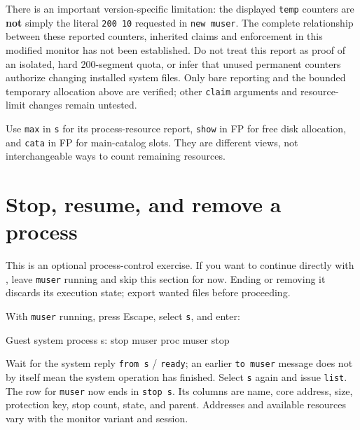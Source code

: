 There is an important version-specific limitation: the displayed \passthrough{\lstinline!temp!} counters are \textbf{not} simply the literal \passthrough{\lstinline!200 10!} requested in \passthrough{\lstinline!new muser!}. The complete relationship between these reported counters, inherited claims and enforcement in this modified monitor has not been established. Do not treat this report as proof of an isolated, hard 200-segment quota, or infer that unused permanent counters authorize changing installed system files. Only bare reporting and the bounded temporary allocation above are verified; other \passthrough{\lstinline!claim!} arguments and resource-limit changes remain untested.

Use \passthrough{\lstinline!max!} in \passthrough{\lstinline!s!} for its process-resource report, \passthrough{\lstinline!show!} in FP for free disk allocation, and \passthrough{\lstinline!cata!} in FP for main-catalog slots. They are different views, not interchangeable ways to count remaining resources.

\section{Stop, resume, and remove a process}\label{stop-resume-and-remove-a-process}

This is an optional process-control exercise. If you want to continue directly
with ,
leave \texttt{muser} running and skip this section for now. Ending or removing
it discards its execution state; export wanted files before proceeding.

With \passthrough{\lstinline!muser!} running, press Escape, select \passthrough{\lstinline!s!}, and enter:

\begin{commandexample}{Guest system process s: stop muser}
proc muser stop
\end{commandexample}

Wait for the system reply \passthrough{\lstinline!from s!} / \passthrough{\lstinline!ready!}; an earlier \passthrough{\lstinline!to muser!} message does not by itself mean the system operation has finished. Select \passthrough{\lstinline!s!} again and issue \passthrough{\lstinline!list!}. The row for \passthrough{\lstinline!muser!} now ends in \passthrough{\lstinline!stop s!}. Its columns are name, core address, size, protection key, stop count, state, and parent. Addresses and available resources vary with the monitor variant and session.

